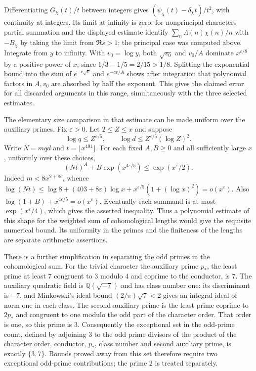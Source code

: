 \documentclass[11pt]{amsart}
\theoremstyle{definition}
\theoremstyle{remark}
\begin{document}
Differentiating $G_\chi(t)/t$ between integers gives
$(\psi_\chi(t)-\delta_\chi t)/t^2$, with continuity at integers.
Its limit at infinity is zero: for nonprincipal characters partial
summation and the displayed estimate identify
$\sum_n\Lambda(n)\chi(n)/n$ with $-B_\chi$ by taking the limit
from $\Re s>1$; the principal case was computed above.
Integrate from $y$ to infinity. With $v_0=\log y$,
both $\sqrt{v_0}$ and $v_0/A$ dominate
$x^{\varepsilon/8}$ by a positive power of $x$, since
$1/3-1/5=2/15>1/8$. Splitting the exponential bound into the
sum of $e^{-c\sqrt v}$ and $e^{-cv/A}$ shows after integration
that polynomial factors in $A,v_0$ are absorbed by half the
exponent. This gives the claimed error for all discarded arguments
in this range, simultaneously with the three selected estimates.

The elementary size comparison in that estimate can be made uniform
over the auxiliary primes. Fix $\varepsilon>0$. Let $2\le Z\le x$ and
suppose
\[
 \log q\le Z^{\varepsilon/5},\qquad
 \log d\le Z^{\varepsilon/5}(\log Z)^2 .
\]
Write $N=mqd$ and $t=\lfloor x^{401}\rfloor$. For each fixed $A,B\ge0$
and all sufficiently large $x$, uniformly over these choices,
\[
 (Nt)^A+B\exp(x^{4\varepsilon/5})
       \le \exp(x^\varepsilon/2).
\]
Indeed $m<8x^{2+8\varepsilon}$, whence
$\log(Nt)\le\log8+(403+8\varepsilon)\log x+
x^{\varepsilon/5}(1+(\log x)^2)=o(x^\varepsilon)$.
Also $\log(1+B)+x^{4\varepsilon/5}=o(x^\varepsilon)$.
Eventually each summand is at most $\exp(x^\varepsilon/4)$,
which gives the asserted inequality. Thus a polynomial estimate of
this shape for the weighted sum of cohomological lengths would give
the requisite numerical bound. Its uniformity in the primes and
the finiteness of the lengths are separate arithmetic assertions.

There is a further simplification in separating the odd primes in
the cohomological sum. For the trivial character the auxiliary prime
$p_*$, the least prime at least $7$ congruent to $3$ modulo $4$ and
coprime to the conductor, is $7$. The auxiliary quadratic field is
$\mathbb Q(\sqrt{-7})$ and has class number one: its discriminant is
$-7$, and Minkowski's ideal bound $(2/\pi)\sqrt7<2$ gives an integral
ideal of norm one in each class. The second auxiliary prime is the
least prime coprime to $2p_*$ and congruent to one modulo the odd part
of the character order. That order is one, so this prime is $3$.
Consequently the exceptional set in the odd-prime count, defined by
adjoining $3$ to the odd prime divisors of the product of the character
order, conductor, $p_*$, class number and second auxiliary prime,
is exactly $\{3,7\}$. Bounds proved away from this set therefore
require two exceptional odd-prime contributions; the prime $2$ is
treated separately.
\end{document}
